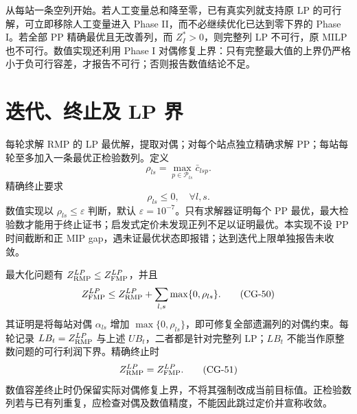 \documentclass[UTF8,a4paper,11pt]{ctexart}
\newcommand{\cg}[1]{\tag{CG-#1}}
\begin{document}
从每站一条空列开始。若人工变量总和降至零，已有真实列就支持原 LP 的可行解，可立即移除人工变量进入 Phase II，而不必继续优化已达到零下界的 Phase I。若全部 PP 精确最优且无改善列，而 $Z_I^*>0$，则完整列 LP 不可行，原 MILP 也不可行。数值实现还利用 Phase I 对偶修复上界：只有完整最大值的上界仍严格小于负可行容差，才报告不可行；否则报告数值结论不足。

\section{迭代、终止及 LP 界}
每轮求解 RMP 的 LP 最优解，提取对偶；对每个站点独立精确求解 PP；每站每轮至多加入一条最优正检验数列。定义
\begin{equation}\rho_{ls}=\max_{p\in\mathcal P_{ls}}\bar c_{lsp}.\cg{48}\end{equation}
精确终止要求
\begin{equation}\rho_{ls}\leq0,\quad\forall l,s.\cg{49}\end{equation}
数值实现以 $\rho_{ls}\leq\varepsilon$ 判断，默认 $\varepsilon=10^{-7}$。只有求解器证明每个 PP 最优，最大检验数才能用于终止证书；启发式定价未发现正列不足以证明最优。本实现不设 PP 时间截断和正 MIP gap，遇未证最优状态即报错；达到迭代上限单独报告未收敛。

最大化问题有 $Z_{\rm RMP}^{LP}\leq Z_{\rm FMP}^{LP}$，并且
\begin{equation}
Z_{\rm FMP}^{LP}\leq Z_{\rm RMP}^{LP}+\sum_{l,s}\max\{0,\rho_{ls}\}.\cg{50}
\end{equation}
其证明是将每站对偶 $\alpha_{ls}$ 增加 $\max\{0,\rho_{ls}\}$，即可修复全部遗漏列的对偶约束。每轮记录 $LB_t=Z_{\rm RMP}^{LP}$ 与上述 $UB_t$，二者都是针对完整列 LP；$LB_t$ 不能当作原整数问题的可行利润下界。精确终止时
\begin{equation}Z_{\rm RMP}^{LP}=Z_{\rm FMP}^{LP}.\cg{51}\end{equation}
数值容差终止时仍保留实际对偶修复上界，不将其强制改成当前目标值。正检验数列若与已有列重复，应检查对偶及数值精度，不能因此跳过定价并宣称收敛。
\end{document}

